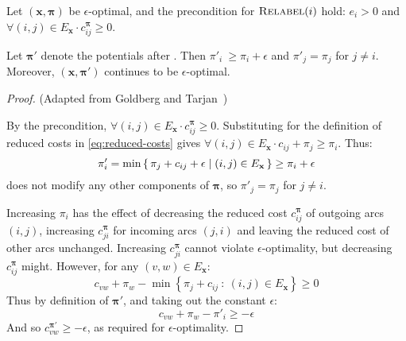 \begin{lemma} \label{lemma:cost-scaling-relabel-correctness}
Let $\left(\mathbf{x},\boldsymbol{\pi}\right)$ be $\epsilon$-optimal, and the precondition for $\textproc{Relabel}(i)$ hold: $e_i > 0$ and $\forall(i,j) \in E_{\mathbf{x}} \cdot c^{\boldsymbol{\pi}}_{ij} \geq 0$.

Let $\boldsymbol{\pi}'$ denote the potentials after . Then $\pi'_i\ \geq \pi_i + \epsilon$ and $\pi'_j = \pi_j$ for $j \neq i$. Moreover, $\left(\mathbf{x},\boldsymbol{\pi}'\right)$ continues to be $\epsilon$-optimal.
\end{lemma}
\begin{proof} (Adapted from Goldberg and Tarjan~\cite[lemma~5.2]{Goldberg:1987})
    
By the precondition, $\forall(i,j) \in E_{\mathbf{x}} \cdot c^{\boldsymbol{\pi}}_{ij} \geq 0$. Substituting for the definition of reduced costs in \cref{eq:reduced-costs} gives $\forall(i,j) \in E_{\mathbf{x}} \cdot c_{ij} + \pi_j \geq \pi_i$. Thus:
\[\pi'_i = \min \set{\pi_j + c_{ij} + \epsilon | (i,j) \in E_{\mathbf{x}}} \geq \pi_i + \epsilon\]
 does not modify any other components of $\boldsymbol{\pi}$, so $\pi'_j = \pi_j$ for $j \neq i$.

Increasing $\pi_i$ has the effect of decreasing the reduced cost $c^{\boldsymbol{\pi}}_{ij}$ of outgoing arcs $(i,j)$, increasing $c^{\boldsymbol{\pi}}_{ji}$ for incoming arcs $(j,i)$ and leaving the reduced cost of other arcs unchanged. Increasing $c^{\boldsymbol{\pi}}_{ji}$ cannot violate $\epsilon$-optimality, but decreasing $c^{\boldsymbol{\pi}}_{ij}$ might. However, for any $(v,w) \in E_{\mathbf{x}}$:
\[c_{vw} + \pi_w - \min \left\{\pi_j + c_{ij} \::\: (i,j) \in E_{\mathbf{x}}\right\} \geq 0\]
Thus by definition of $\boldsymbol{\pi}'$, and taking out the constant $\epsilon$:
\[c_{vw} + \pi_w - \pi'_i \geq -\epsilon\]
And so $c_{vw}^{\boldsymbol{\pi}'} \geq -\epsilon$, as required for $\epsilon$-optimality.
\end{proof}

